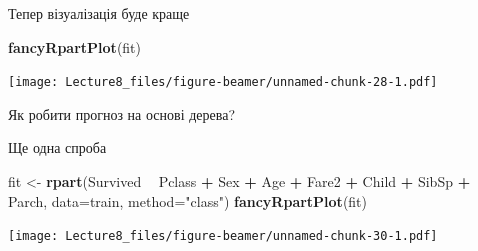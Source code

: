 \documentclass[ignorenonframetext,]{beamer}
\newenvironment{Shaded}{\begin{snugshade}}{\end{snugshade}}
\newcommand{\DataTypeTok}[1]{\textcolor[rgb]{0.13,0.29,0.53}{#1}}
\newcommand{\KeywordTok}[1]{\textcolor[rgb]{0.13,0.29,0.53}{\textbf{#1}}}
\newcommand{\NormalTok}[1]{#1}
\newcommand{\OperatorTok}[1]{\textcolor[rgb]{0.81,0.36,0.00}{\textbf{#1}}}
\newcommand{\OtherTok}[1]{\textcolor[rgb]{0.56,0.35,0.01}{#1}}
\newcommand{\StringTok}[1]{\textcolor[rgb]{0.31,0.60,0.02}{#1}}
\begin{document}
\begin{frame}[fragile]{Тепер візуалізація буде краще}
\protect\hypertarget{ux442ux435ux43fux435ux440-ux432ux456ux437ux443ux430ux43bux456ux437ux430ux446ux456ux44f-ux431ux443ux434ux435-ux43aux440ux430ux449ux435}{}

\begin{Shaded}
\begin{Highlighting}[]
\KeywordTok{fancyRpartPlot}\NormalTok{(fit)}
\end{Highlighting}
\end{Shaded}

\texttt{[image: Lecture8\_files/figure-beamer/unnamed-chunk-28-1.pdf]}

\end{frame}

\begin{frame}[fragile]{Як робити прогноз на основі дерева?}
\protect\hypertarget{ux44fux43a-ux440ux43eux431ux438ux442ux438-ux43fux440ux43eux433ux43dux43eux437-ux43dux430-ux43eux441ux43dux43eux432ux456-ux434ux435ux440ux435ux432ux430}{}

\begin{Shaded}
\end{Shaded}

\end{frame}

\begin{frame}[fragile]{Ще одна спроба}
\protect\hypertarget{ux449ux435-ux43eux434ux43dux430-ux441ux43fux440ux43eux431ux430}{}

\begin{Shaded}
\begin{Highlighting}[]
\NormalTok{fit <-}\StringTok{ }\KeywordTok{rpart}\NormalTok{(Survived }\OperatorTok{~}\StringTok{ }\NormalTok{Pclass }\OperatorTok{+}\StringTok{ }\NormalTok{Sex }\OperatorTok{+}\StringTok{ }\NormalTok{Age }\OperatorTok{+}\StringTok{ }\NormalTok{Fare2 }\OperatorTok{+}\StringTok{ }\NormalTok{Child }\OperatorTok{+}\StringTok{ }\NormalTok{SibSp }\OperatorTok{+}\StringTok{ }\NormalTok{Parch,}
               \DataTypeTok{data=}\NormalTok{train,}
               \DataTypeTok{method=}\StringTok{"class"}\NormalTok{)}
\KeywordTok{fancyRpartPlot}\NormalTok{(fit)}
\end{Highlighting}
\end{Shaded}

\texttt{[image: Lecture8\_files/figure-beamer/unnamed-chunk-30-1.pdf]}

\end{frame}
\end{document}
